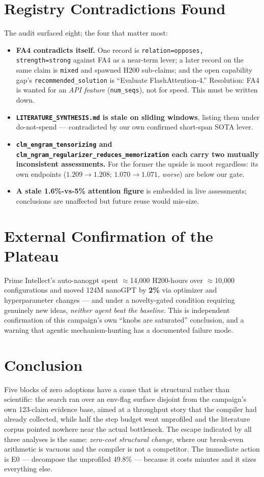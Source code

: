 \documentclass{article}
\begin{document}
\section{Registry Contradictions Found}
The audit surfaced eight; the four that matter most:
\begin{itemize}\itemsep2pt
\item \textbf{FA4 contradicts itself.} One record is \texttt{relation=opposes, strength=strong} against FA4 as a near-term lever; a later record on the same claim is \texttt{mixed} and spawned H200 sub-claims; and the open capability gap's \texttt{recommended\_solution} is ``Evaluate FlashAttention-4.'' Resolution: FA4 is wanted for an \emph{API feature} (\texttt{num\_seqs}), not for speed. This must be written down.
\item \textbf{\texttt{LITERATURE\_SYNTHESIS.md} is stale on sliding windows}, listing them under do-not-spend --- contradicted by our own confirmed short-span SOTA lever.
\item \textbf{\texttt{clm\_engram\_tensorizing} and \texttt{clm\_ngram\_regularizer\_reduces\_memorization} each carry two mutually inconsistent assessments.} For the former the upside is moot regardless: its own endpoints ($1.209\to1.208$; $1.070\to1.071$, \emph{worse}) are below our gate.
\item \textbf{A stale 1.6\%-vs-5\% attention figure} is embedded in live assessments; conclusions are unaffected but future reuse would mis-size.
\end{itemize}

\section{External Confirmation of the Plateau}
Prime Intellect's auto-nanogpt spent $\approx$14{,}000 H200-hours over $\approx$10{,}000 configurations and moved 124M nanoGPT by \textbf{2\%} via optimizer and hyperparameter changes --- and under a novelty-gated condition requiring genuinely new ideas, \emph{neither agent beat the baseline}. This is independent confirmation of this campaign's own ``knobs are saturated'' conclusion, and a warning that agentic mechanism-hunting has a documented failure mode.

\section{Conclusion}
Five blocks of zero adoptions have a cause that is structural rather than scientific: the search ran over an env-flag surface disjoint from the campaign's own 123-claim evidence base, aimed at a throughput story that the compiler had already collected, while half the step budget went unprofiled and the literature corpus pointed nowhere near the actual bottleneck. The escape indicated by all three analyses is the same: \emph{zero-cost structural change}, where our break-even arithmetic is vacuous and the compiler is not a competitor. The immediate action is E0 --- decompose the unprofiled 49.8\% --- because it costs minutes and it sizes everything else.
\end{document}
